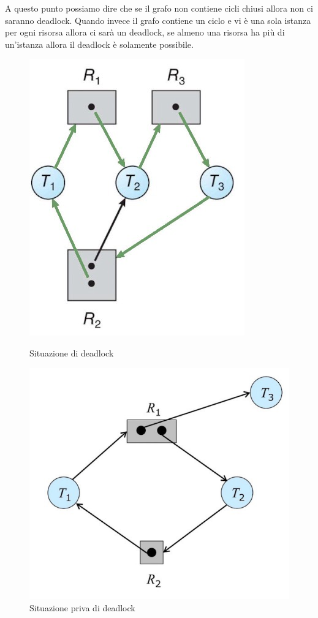 \spacer
A questo punto possiamo dire che se il grafo non contiene cicli chiusi allora non ci saranno deadlock. Quando invece il grafo contiene un ciclo e vi è una sola istanza per ogni risorsa allora ci sarà un deadlock, se almeno una risorsa ha più di un'istanza allora il deadlock è solamente possibile.

\begin{figure}[H]
    \centering
    \begin{minipage}{0.45\textwidth}
        \centering
        \includegraphics[width=0.65\linewidth]{assets/ciclo-deadlock.jpg}
        \caption{Situazione di deadlock}
    \end{minipage}
    \hfill
    \begin{minipage}{0.45\textwidth}
        \centering
        \includegraphics[width=0.9\linewidth]{assets/ciclo-no-deadlock.jpg}
        \caption{Situazione priva di deadlock}
    \end{minipage}
\end{figure}

